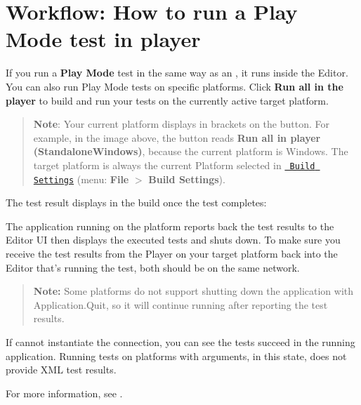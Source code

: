 \chapter{Workflow\+: How to run a Play Mode test in player}
\hypertarget{md__library_2_package_cache_2com_8unity_8test-framework_0d1_81_833_2_documentation_0i_2workflow-run-playmode-test-standalone}{}\label{md__library_2_package_cache_2com_8unity_8test-framework_0d1_81_833_2_documentation_0i_2workflow-run-playmode-test-standalone}
\label{md__library_2_package_cache_2com_8unity_8test-framework_0d1_81_833_2_documentation_0i_2workflow-run-playmode-test-standalone_autotoc_md730}%
%
 If you run a {\bfseries{Play Mode}} test in the same way as an , it runs inside the  Editor. You can also run Play Mode tests on specific platforms. Click {\bfseries{Run all in the player}} to build and run your tests on the currently active target platform.



\begin{quote}
{\bfseries{Note}}\+: Your current platform displays in brackets on the button. For example, in the image above, the button reads {\bfseries{Run all in player (Standalone\+Windows)}}, because the current platform is Windows. The target platform is always the current Platform selected in \href{https://docs.unity3d.com/Manual/BuildSettings.html}{\texttt{ Build Settings}} (menu\+: {\bfseries{File}} \texorpdfstring{$>$}{>} {\bfseries{Build Settings}}). \end{quote}
The test result displays in the build once the test completes\+:



The application running on the platform reports back the test results to the Editor UI then displays the executed tests and shuts down. To make sure you receive the test results from the Player on your target platform back into the Editor that’s running the test, both should be on the same network.

\begin{quote}
{\bfseries{Note\+:}} Some platforms do not support shutting down the application with {\ttfamily Application.\+Quit}, so it will continue running after reporting the test results. \end{quote}
If  cannot instantiate the connection, you can see the tests succeed in the running application. Running tests on platforms with arguments, in this state, does not provide XML test results.

For more information, see . 